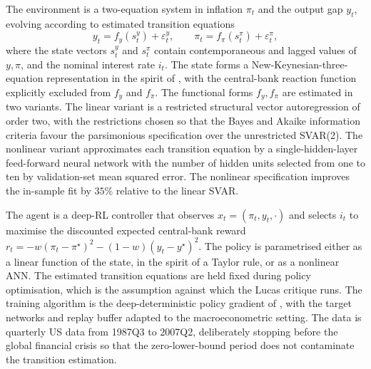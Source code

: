 The environment is a two-equation system in inflation $\pi_t$ and the output
gap $y_t$, evolving according to estimated transition equations
\begin{equation}
y_t = f_y(s^y_t) + \varepsilon^y_t, \qquad
\pi_t = f_\pi(s^\pi_t) + \varepsilon^\pi_t,
\label{eq:hinterlang_env}
\end{equation}
where the state vectors $s^y_t$ and $s^\pi_t$ contain contemporaneous and
lagged values of $y, \pi$, and the nominal interest rate $i_t$. The state
forms a New-Keynesian-three-equation representation in the spirit of
\citet{RotembergWoodford1997}, with the central-bank reaction function
explicitly excluded from $f_y$ and $f_\pi$. The functional forms $f_y, f_\pi$
are estimated in two variants. The linear variant is a restricted structural
vector autoregression of order two, with the restrictions chosen so that the
Bayes and Akaike information criteria favour the parsimonious specification
over the unrestricted SVAR(2). The nonlinear variant approximates each
transition equation by a single-hidden-layer feed-forward neural network with
the number of hidden units selected from one to ten by validation-set mean
squared error. The nonlinear specification improves the in-sample fit by
$35\%$ relative to the linear SVAR.

The agent is a deep-RL controller that observes $x_t = (\pi_t, y_t, \cdot)$
and selects $i_t$ to maximise the discounted expected central-bank reward
$r_t = - w (\pi_t - \pi^\star)^2 - (1 - w) (y_t - y^\star)^2$. The policy is
parametrised either as a linear function of the state, in the spirit of a
Taylor rule, or as a nonlinear ANN. The estimated transition equations are
held fixed during policy optimisation, which is the assumption against which
the Lucas critique runs. The training algorithm is the deep-deterministic
policy gradient of \citet{LillicrapDDPG2016}, with the target networks and
replay buffer adapted to the macroeconometric setting. The data is quarterly
US data from 1987Q3 to 2007Q2, deliberately stopping before the global
financial crisis so that the zero-lower-bound period does not contaminate the
transition estimation.

